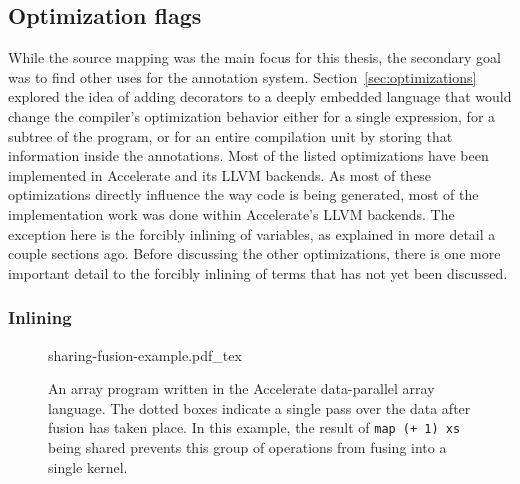 \documentclass[fontsize=11pt,a4paper,parskip=half,numbers=noenddot]{scrartcl}
\newcommand{\hask}[1]{\texttt{#1}}
\begin{document}
\subsection{Optimization flags}


While the source mapping was the main focus for this thesis, the secondary goal
was to find other uses for the annotation system.
Section~\ref{sec:optimizations} explored the idea of adding decorators to a
deeply embedded language that would change the compiler's optimization behavior
either for a single expression, for a subtree of the program, or for an entire
compilation unit by storing that information inside the annotations. Most of the
listed optimizations have been implemented in Accelerate and its LLVM backends.
As most of these optimizations directly influence the way code is being
generated, most of the implementation work was done within Accelerate's LLVM
backends. The exception here is the forcibly inlining of variables, as explained
in more detail a couple sections ago. Before discussing the other optimizations,
there is one more important detail to the forcibly inlining of terms that has
not yet been discussed.

\subsubsection{Inlining}

\begin{figure}[t]
  \centering
  \def\svgwidth{\linewidth}
  {sharing-fusion-example.pdf_tex}
  \caption{An array program written in the Accelerate data-parallel array
    language. The dotted boxes indicate a single pass over the data after fusion
    has taken place. In this example, the result of \hask{map (+ 1) xs} being
    shared prevents this group of operations from fusing into a single
    kernel.}\label{fig:sharing-fusion-example}
\end{figure}
\end{document}
